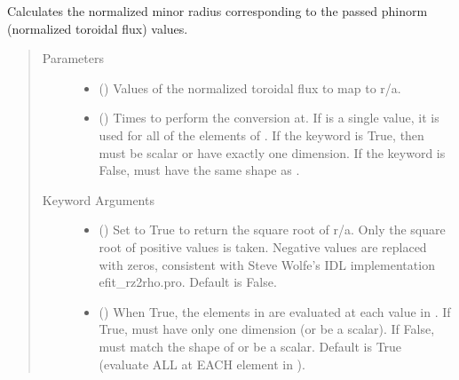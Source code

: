 \documentclass[letterpaper,10pt,english]{sphinxmanual}
\begin{document}
\begin{fulllineitems}
\begin{fulllineitems}
\label{\detokenize{eqtools:eqtools.core.Equilibrium.phinorm2roa}}
Calculates the normalized minor radius corresponding to the passed phinorm (normalized toroidal flux) values.
\begin{quote}\begin{description}
\item[{Parameters}] \leavevmode\begin{itemize}
\item {} 
 () \textendash{} Values of the normalized
toroidal flux to map to r/a.

\item {} 
 () \textendash{} Times to perform the conversion at.
If  is a single value, it is used for all of the elements of
. If the  keyword is True, then  must be scalar
or have exactly one dimension. If the  keyword is False,
 must have the same shape as .

\end{itemize}

\item[{Keyword Arguments}] \leavevmode\begin{itemize}
\item {} 
 () \textendash{} Set to True to return the square root of r/a.
Only the square root of positive values is taken. Negative
values are replaced with zeros, consistent with Steve Wolfe’s
IDL implementation efit\_rz2rho.pro. Default is False.

\item {} 
 () \textendash{} When True, the elements in  are evaluated
at each value in . If True,  must have only one dimension
(or be a scalar). If False,  must match the shape of 
or be a scalar. Default is True (evaluate ALL  at EACH
element in ).


\end{itemize}
\end{description}
\end{quote}
\end{fulllineitems}
\end{fulllineitems}
\end{document}
